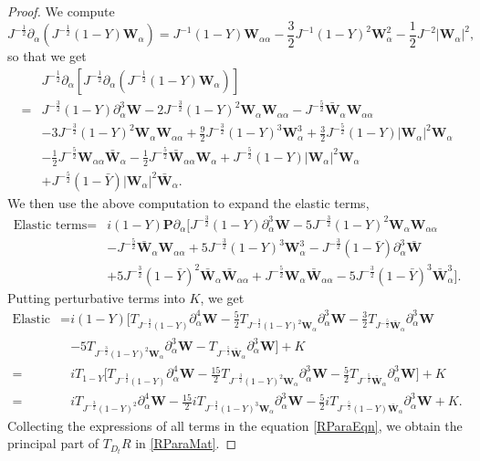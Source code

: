 \documentclass[10pt]{amsart}
\theoremstyle{remark}
\theoremstyle{definition}
\numberwithin{equation}{section}
\newcommand{\p}{\partial}
\newcommand{\al}{\alpha}
\newcommand{\f}{\frac}
\newcommand{\bw}{\mathbf{W}}
\newcommand{\nP}{{\mathbf P}}
\begin{document}
\begin{proof}
We compute
\begin{equation*}
 J^{-\f12}\p_\al(J^{-\f12}(1-Y)\bw_\alpha) = J^{-1}(1-Y)\bw_{\al \al} -\f32 J^{-1}(1-Y)^2\bw^2_\al -\f12 J^{-2}|\bw_\al|^2,
\end{equation*}
so that we get
\begin{align*}
   &J^{-\f12}\p_\al[J^{-\f12}\p_\al(J^{-\f12}(1-Y)\bw_\alpha)] \\
   =&  J^{-\f32}(1-Y)\p_\al^3\bw -2J^{-\f32}(1-Y)^2\bw_\al \bw_{\al \al}-J^{-\f52}\bar{\bw}_\al \bw_{\al \al} \\
   &-3J^{-\f32}(1-Y)^2\bw_\al \bw_{\al \al} + \f92 J^{-\f32}(1-Y)^3\bw_\al^3+\f32 J^{-\f52}(1-Y)|\bw_\alpha |^2\bw_\al\\
   &- \f12 J^{-\f52}\bw_{\al \al}\bar{\bw}_\al - \f12 J^{-\f52}\bar{\bw}_{\al \al}\bw_\al +  J^{-\f52}(1-Y) |\bw_\alpha |^2\bw_\al \\
   &+ J^{-\f52}(1-\bar{Y}) |\bw_\alpha |^2\bar{\bw}_\al.
\end{align*}
We then use the above computation to expand the elastic terms,
\begin{align*}
 \text{Elastic terms} =& i(1-Y)\nP\p_\al [J^{-\f32}(1-Y)\p_\al^3\bw -5J^{-\f32}(1-Y)^2\bw_\al \bw_{\al \al}\\
 &-J^{-\f52}\bar{\bw}_\al \bw_{\al \al}  + 5 J^{-\f32}(1-Y)^3\bw_\al^3 -J^{-\f32}(1-\bar{Y})\p_\al^3\bar{\bw} \\
 & +5J^{-\f32}(1-\bar{Y})^2\bar{\bw}_\al \bar{\bw}_{\al \al}+ J^{-\f52}\bw_\al \bar{\bw}_{\al \al}-5 J^{-\f32}(1-\bar{Y})^3\bar{\bw}_\al^3].
\end{align*}
Putting perturbative terms into $K$, we get  
\begin{align*}
 \text{Elastic terms} =& i(1-Y)\Big[T_{J^{-\f32}(1-Y)}\p_\al^4 \bw -\f52T_{J^{-\f32}(1-Y)^2 \bw_\al} \p_\al^3 \bw - \f32T_{J^{-\f52}\bar{\bw}_\al}\p_\al^3 \bw \\
 &-5T_{J^{-\f32}(1-Y)^2 \bw_\al} \p_\al^3 \bw - T_{J^{-\f52}\bar{\bw}_\al}\p_\al^3 \bw\Big] + K \\
 =&iT_{1-Y}\Big[T_{J^{-\f32}(1-Y)}\p_\al^4 \bw -\frac{15}{2}T_{J^{-\f32}(1-Y)^2 \bw_\al} \p_\al^3 \bw - \f52T_{J^{-\f52}\bar{\bw}_\al}\p_\al^3 \bw \Big] + K \\
 =& iT_{J^{-\frac{3}{2}}(1-Y)^2}\p^4_\alpha\bw -\frac{15}{2}iT_{J^{-\f32}(1-Y)^3 \bw_\al} \p_\al^3 \bw - \f52iT_{J^{-\f52}(1-Y)\bar{\bw}_\al}\p_\al^3 \bw + K.
\end{align*}
Collecting the expressions of all terms in the equation \eqref{RParaEqn}, we obtain the principal part of $T_{D_t}R$ in \eqref{RParaMat}.
\end{proof}
\end{document}
